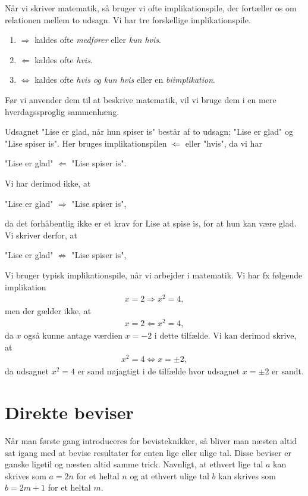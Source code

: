 Når vi skriver matematik, så bruger vi ofte implikationspile, der fortæller os om relationen mellem to udsagn. Vi har tre forskellige implikationspile.
\begin{enumerate}[label=\roman*)]
	\item $\Rightarrow$ kaldes ofte \textit{medfører} eller \textit{kun hvis}.
	\item $\Leftarrow$ kaldes ofte \textit{hvis}.
	\item $\Leftrightarrow$ kaldes ofte \textit{hvis og kun hvis} eller en \textit{biimplikation}.
\end{enumerate}
Før vi anvender dem til at beskrive matematik, vil vi bruge dem i en mere hverdagssproglig sammenhæng.
\begin{exa}
	Udsagnet "Lise er glad, når hun spiser is" består af to udsagn; "Lise er glad" og "Lise spiser is". Her bruges 
	implikationspilen $\Leftarrow$ eller "hvis", da vi har
	\begin{center}
		"Lise er glad" $\Leftarrow$ "Lise spiser is".
	\end{center}
	Vi har derimod ikke, at
	\begin{center}
		"Lise er glad" $\Rightarrow$ "Lise spiser is",
	\end{center}
	da det forhåbentlig ikke er et krav for Lise at spise is, for at hun kan være glad. 
	Vi skriver derfor, at 
	\begin{center}
		"Lise er glad" $\not\Rightarrow$ "Lise spiser is",
	\end{center}
\end{exa}
\begin{exa}
	Vi bruger typisk implikationspile, når vi arbejder i matematik. Vi har fx følgende implikation
	\begin{align*}
		x = 2 \Rightarrow x^2 = 4,
	\end{align*}
	men der gælder ikke, at
	\begin{align*}
		x = 2 \Leftarrow x^2 = 4,
	\end{align*}
	da $x$ også kunne antage værdien $x = -2$ i dette tilfælde. Vi kan derimod skrive, at
	\begin{align*}
		x^2 = 4 \Leftrightarrow x = \pm 2,
	\end{align*}
	da udsagnet $x^2 = 4$ er sand nøjagtigt i de tilfælde hvor udsagnet $x = \pm 2$ er sandt. 
\end{exa}

\newpage
\section*{Direkte beviser}
Når man første gang introduceres for bevisteknikker, så bliver man næsten altid sat igang med at bevise resultater for enten lige eller ulige tal. Disse beviser er ganske ligetil og næsten altid samme trick. Navnligt, at ethvert lige tal $a$ kan skrives som $a = 2n$ for et heltal $n$ og at ethvert ulige tal $b$ kan skrives som $b = 2m + 1$ for et heltal $m$. 


